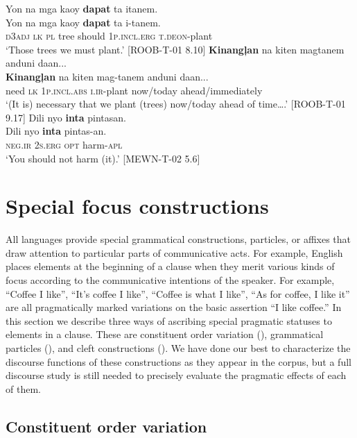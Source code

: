 \ea 
\label{bkm:Ref118711236}
Yon  na  mga  kaoy  \textbf{dapat}  ta  itanem. \\\smallskip
\gll Yon  na  mga  kaoy  \textbf{dapat}  ta  i-tanem. \\
\textsc{d}3\textsc{adj}  \textsc{lk}  \textsc{pl}  tree  should  1\textsc{p.incl.erg}  \textsc{t.deon}-plant \\
\glt ‘Those trees we must plant.’ [ROOB-T-01 8.10]
\z
\ea
\textbf{Kinangļan}  na  kiten  magtanem  anduni  daan... \\\smallskip
\gll \textbf{Kinangļan}  na  kiten  mag-tanem  anduni  daan... \\
need  \textsc{lk}  1\textsc{p.incl.abs}  \textsc{i.ir}-plant  now/today  ahead/immediately \\
\glt ‘(It is) necessary that we plant (trees) now/today ahead of time….’ [ROOB-T-01 9.17]
\z
\ea
Dili  nyo  \textbf{inta}  pintasan. \\\smallskip
\gll Dili  nyo  \textbf{inta}  pintas-an. \\
\textsc{neg.ir}  2\textsc{s.erg}  \textsc{opt}  harm-\textsc{apl} \\
\glt ‘You should not harm (it).’ [MEWN-T-02 5.6]
\z
\section{Special focus constructions}
\label{bkm:Ref445900433}
All languages provide special grammatical constructions, particles, or affixes that draw attention to particular parts of communicative acts. For example, English places elements at the beginning of a clause when they merit various kinds of focus according to the communicative intentions of the speaker. For example, “Coffee I like”, “It’s coffee I like”, “Coffee is what I like”, “As for coffee, I like it” are all pragmatically marked variations on the basic assertion “I like coffee.” In this section we describe three ways of ascribing special pragmatic statuses to elements in a clause. These are constituent order variation (), grammatical particles (), and cleft constructions (). We have done our best to characterize the discourse functions of these constructions as they appear in the corpus, but a full discourse study is still needed to precisely evaluate the pragmatic effects of each of them.


\subsection{Constituent order variation}
\label{bkm:Ref445900436}\label{sec:constituentordervariation}

